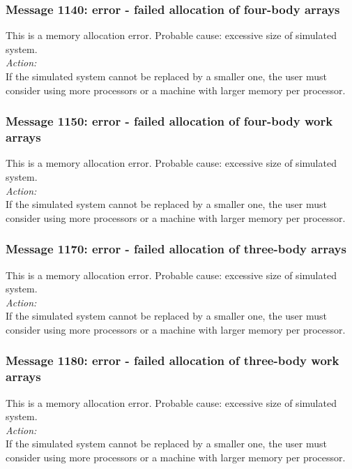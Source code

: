 \subsubsection*{Message 1140: error - failed allocation of four-body
arrays}

This is a memory allocation error. Probable cause: excessive size of
simulated system. \\

\noindent
{\em Action:}\\
If the simulated system cannot be replaced by a smaller one, the user
must consider using more processors or a machine with larger memory
per processor.

\subsubsection*{Message 1150: error - failed allocation of four-body
work arrays}

This is a memory allocation error. Probable cause: excessive size of
simulated system. \\

\noindent
{\em Action:}\\
If the simulated system cannot be replaced by a smaller one, the user
must consider using more processors or a machine with larger memory
per processor.

\subsubsection*{Message 1170: error - failed allocation of three-body
arrays}

This is a memory allocation error. Probable cause: excessive size of
simulated system. \\

\noindent
{\em Action:}\\
If the simulated system cannot be replaced by a smaller one, the user
must consider using more processors or a machine with larger memory
per processor.

\subsubsection*{Message 1180: error - failed allocation of three-body
work arrays}

This is a memory allocation error. Probable cause: excessive size of
simulated system. \\

\noindent
{\em Action:}\\
If the simulated system cannot be replaced by a smaller one, the user
must consider using more processors or a machine with larger memory
per processor.

